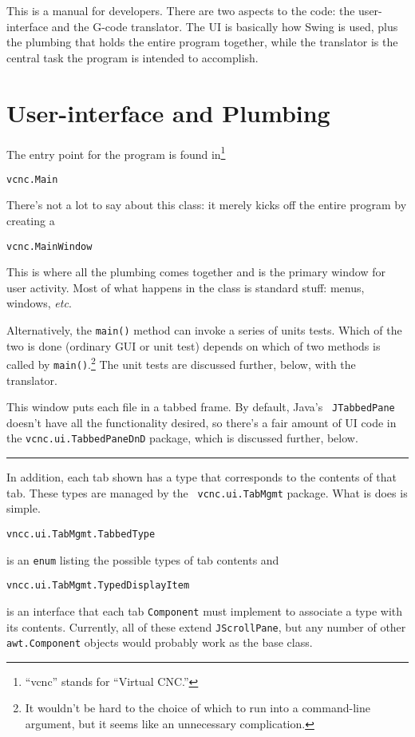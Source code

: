 \documentclass[titlepage,oneside,10pt]{article}
\newcommand\rulediv{\vskip 0mm\hfil\rule{0.4\textwidth}{0.4pt}\hfil\vskip 1mm}
\begin{document}
\raggedbottom

\newcommand{\mymargin}[1]{\marginpar{\rm\tiny #1}}
\newcommand{\leftmar}[1]{\reversemarginpar \mymargin{#1}}

This is a manual for developers.
There are two aspects to the code: the user-interface and the G-code
translator. The UI is basically how Swing is used, plus the plumbing
that holds the entire program together, while the translator
is the central task the program is intended to accomplish.

\section{User-interface and Plumbing}

The entry point for the program is found in\footnote{``vcnc'' stands
for ``Virtual CNC.''}
\begin{verbatim}
vcnc.Main
\end{verbatim}
There's not a lot to say about this class: it merely kicks off the entire
program by creating a 
\begin{verbatim}
vcnc.MainWindow
\end{verbatim}
This is where all the plumbing comes together and is the primary
window for user activity. Most of what happens in the class is
standard stuff: menus, windows, \emph{etc}.

Alternatively, the {\tt main()} method can invoke a series of units
tests. Which of the two is done (ordinary GUI or unit test) depends on
which of two methods is called by {\tt main()}.\footnote{It wouldn't
be hard to the choice of which to run into a command-line argument,
but it seems like an unnecessary complication.} The unit tests are
discussed further, below, with the translator.

This window puts each file in a tabbed frame. By default, Java's {\tt
  JTabbedPane} doesn't have all the functionality desired, so there's
a fair amount of UI code in the {\tt vcnc.ui.TabbedPaneDnD} package, which is
discussed further, below.

\rulediv

In addition, each tab shown has a type that corresponds to the
contents of that tab. These types are managed by the {\tt
  vcnc.ui.TabMgmt} package. What is does is simple.

\begin{verbatim}
vncc.ui.TabMgmt.TabbedType
\end{verbatim}
is an {\tt enum} listing the possible types of tab contents and
\begin{verbatim}
vncc.ui.TabMgmt.TypedDisplayItem
\end{verbatim}
is an interface that each tab {\tt Component} must implement to
associate a type with its contents. Currently, all of these extend
{\tt JScrollPane}, but any number of other {\tt awt.Component}
objects would probably work as the base class.
\end{document}
